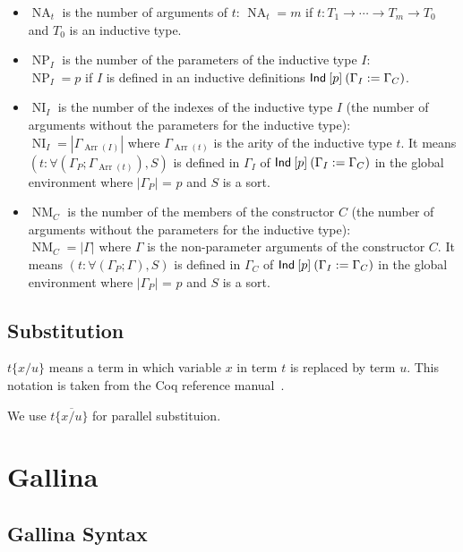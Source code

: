 \documentclass[a4paper,fleqn]{article}
\def\gallina{\textrm{Gallina}}
\DeclareMathOperator{\NA}{NA} %
\DeclareMathOperator{\NP}{NP} %
\DeclareMathOperator{\NI}{NI} %
\DeclareMathOperator{\NM}{NM} %
\DeclareMathOperator{\Arr}{Arr} %
\newcommand{\arr}[1]{\Gamma_{\Arr(#1)}}
\newcommand{\subst}[3]{#1\{#2/#3\}}
\newcommand{\substm}[3]{#1\{\overline{#2/#3}\}}
\begin{document}
\begin{itemize}
  \item $\NA_t$ is the number of arguments of $t$: \quad $\NA_t=m$ if $t : T_1 \rightarrow \dotsb \rightarrow T_m \rightarrow T_0$ and $T_0$ is an inductive type.
  \item $\NP_I$ is the number of the parameters of the inductive type $I$: \\
    $\NP_I=p$ if $I$ is defined in an inductive definitions $\text{\sf Ind}\:[p]\:(\Gamma_I := \Gamma_C)$.
  \item $\NI_I$ is the number of the indexes of the inductive type $I$ (the number of arguments without the parameters for the inductive type): \\
    $\NI_I=|\arr{I}|$ where
    $\arr{t}$ is the arity of the inductive type $t$.
    It means $(t : \forall (\Gamma_P; \arr{t}), S)$ is defined in $\Gamma_I$ of $\text{\sf Ind}\:[p]\:(\Gamma_I := \Gamma_C)$ in the global environment where
    $|\Gamma_P|$ = $p$ and $S$ is a sort.
  \item $\NM_C$ is the number of the members of the constructor $C$ (the number of arguments without the parameters for the inductive type): \\
    $\NM_C=|\Gamma|$ where
    $\Gamma$ is the non-parameter arguments of the constructor $C$.
    It means $(t : \forall (\Gamma_P; \Gamma), S)$ is defined in $\Gamma_C$ of $\text{\sf Ind}\:[p]\:(\Gamma_I := \Gamma_C)$ in the global environment where
    $|\Gamma_P|$ = $p$ and $S$ is a sort.
\end{itemize}

\subsection{Substitution}
$\subst{t}{x}{u}$ means a term in which variable $x$ in term $t$ is replaced by term $u$.
This notation is taken from the Coq reference manual~\cite{coqrefman8.12.0}.

We use $\substm{t}{x}{u}$ for parallel substituion.

\section{\gallina{}}\label{sec:gallina}
\subsection{\gallina{} Syntax}\label{sec:gallina-syntax}
\end{document}
